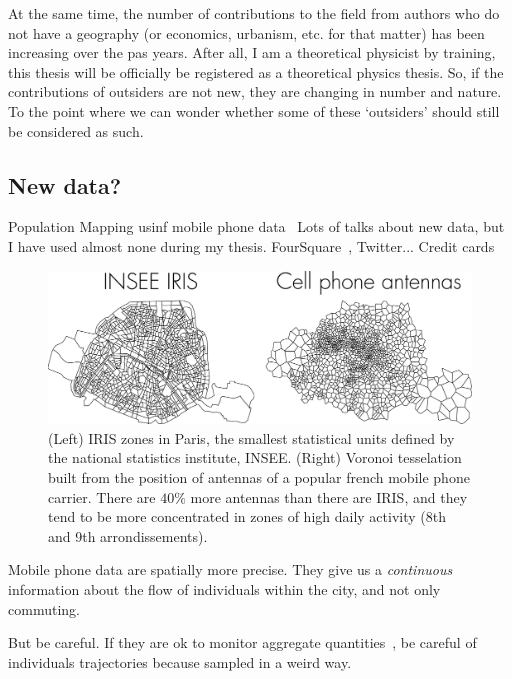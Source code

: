 At the same time, the number of contributions to the field from authors who do
not have a geography (or economics, urbanism, etc. for that matter) has been
increasing over the pas years. After all, I am a theoretical physicist by
training, this thesis will be officially be registered as a theoretical physics
thesis. So, if the contributions of outsiders are not new, they are changing in
number and nature. To the point where we can wonder whether some of these
`outsiders' should still be considered as such.



    \subsection{New data?}
    \label{sub:new_data}

Population Mapping usinf mobile phone data~\cite{Deville:2014}
Lots of talks about new data, but I have used almost none during my thesis.
FourSquare~\cite{Noulas:2012}, Twitter... Credit cards~\cite{Lenormand:2015}

\begin{figure}
    \centering
    \includegraphics[width=\textwidth]{gfx/chapter-intro/IRIS_phone.pdf}
    \caption{(Left) IRIS zones in Paris, the smallest statistical units defined
    by the national statistics institute, INSEE. (Right) Voronoi tesselation
    built from the position of antennas of a popular french mobile phone carrier.
    There are $40\%$ more antennas than there are IRIS, and they tend to be more
    concentrated in zones of high daily activity (8th and 9th
    arrondissements).\label{fig:IRIS_phone}}
\end{figure}

Mobile phone data are spatially more precise. They give us a \emph{continuous}
information about the flow of individuals within the city, and not only
commuting.

But be careful. If they are ok to monitor aggregate
quantities~\cite{Lenormand:2014}, be careful of
individuals trajectories because sampled in a weird way.

